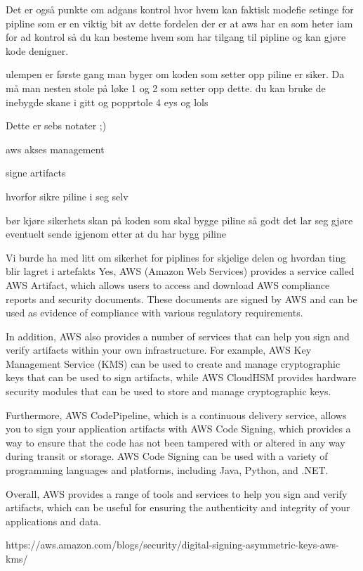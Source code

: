 Det er også punkte om adgans kontrol hvor hvem kan faktisk modefie setinge for pipline som er en viktig bit av dette fordelen der er at aws har en som heter iam for ad kontrol så du kan besteme hvem som har tilgang til pipline og kan gjøre kode denigner.

ulempen er første gang man byger om koden som setter opp piline er siker. Da må man nesten stole på løke 1 og 2 som setter opp dette. du kan bruke de inebygde skane i gitt og popprtole 4 eys og lols

Dette er sebs notater ;)

aws akses management

signe artifacts

hvorfor sikre piline i seg selv

bør kjøre sikerhets skan på koden som skal bygge piline så godt det lar seg gjøre 
eventuelt sende igjenom etter at du har bygg piline

Vi burde ha med litt om sikerhet for piplines 
for skjelige delen og hvordan ting blir lagret i artefakts
Yes, AWS (Amazon Web Services) provides a service called AWS Artifact, which allows users to access and download AWS compliance reports and security documents. These documents are signed by AWS and can be used as evidence of compliance with various regulatory requirements.

In addition, AWS also provides a number of services that can help you sign and verify artifacts within your own infrastructure. For example, AWS Key Management Service (KMS) can be used to create and manage cryptographic keys that can be used to sign artifacts, while AWS CloudHSM provides hardware security modules that can be used to store and manage cryptographic keys.

Furthermore, AWS CodePipeline, which is a continuous delivery service, allows you to sign your application artifacts with AWS Code Signing, which provides a way to ensure that the code has not been tampered with or altered in any way during transit or storage. AWS Code Signing can be used with a variety of programming languages and platforms, including Java, Python, and .NET.

Overall, AWS provides a range of tools and services to help you sign and verify artifacts, which can be useful for ensuring the authenticity and integrity of your applications and data.

https://aws.amazon.com/blogs/security/digital-signing-asymmetric-keys-aws-kms/